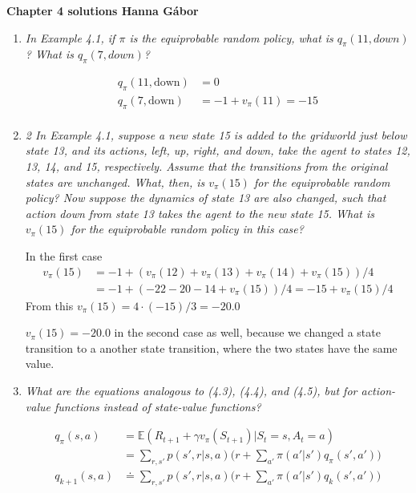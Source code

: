\documentclass[12pt,a4paper]{article}
\begin{document}
\textbf{Chapter 4 solutions  \hfill Hanna Gábor}

\begin{enumerate}
  \item
    \textit{In Example 4.1, if $\pi$ is the equiprobable random policy, what is $q_\pi(11, down)$?
    What is $q_\pi(7, down)$?}

    \begin{align*}
    q_\pi(11, \text{down}) &= 0\\
    q_\pi(7, \text{down}) &= -1 + v_\pi(11) = -15\\
    \end{align*}

  \item
    \textit{2 In Example 4.1, suppose a new state 15 is added to the gridworld just below
    state 13, and its actions, left, up, right, and down, take the agent to states 12, 13, 14,
    and 15, respectively. Assume that the transitions from the original states are unchanged.
    What, then, is $v_\pi(15)$ for the equiprobable random policy? Now suppose the dynamics of
    state 13 are also changed, such that action down from state 13 takes the agent to the new
    state 15. What is $v_\pi(15)$ for the equiprobable random policy in this case?}

    In the first case
    \begin{align*}
      v_\pi(15) &= -1 + (v_\pi(12) + v_\pi(13) + v_\pi(14) + v_\pi(15))/4\\
      &=-1 + (- 22 - 20 - 14 + v_\pi(15))/4 = -15 + v_\pi(15)/4
    \end{align*}
    From this $v_\pi(15) = 4 \cdot (-15) /3 = - 20.0$

    $v_\pi(15) = - 20.0$ in the second case as well, because we changed a state
    transition to a another state transition, where the two states have the same value.

  \item
    \textit{What are the equations analogous to (4.3), (4.4), and (4.5), but for action-value
    functions instead of state-value functions?}

    \begin{align*}
      q_\pi(s, a) &= \mathbb{E}(R_{t + 1} + \gamma v_\pi (S_{t + 1})|S_t = s, A_t = a )\\
      &= \sum\limits_{r, s'} p(s', r | s, a) \Big(r + \sum\limits_{a'} \pi(a'|s') q_\pi(s', a')\Big)\\
      q_{k + 1}(s, a) &\doteq \sum\limits_{r, s'} p(s', r | s, a) \Big(r + \sum\limits_{a'} \pi(a'|s') q_k(s', a')\Big)
    \end{align*}



\end{enumerate}
\end{document}
